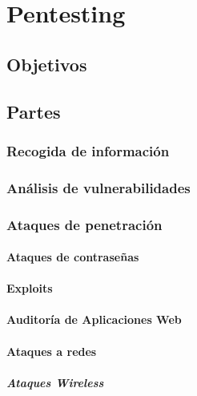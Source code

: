 \chapter{Pentesting}

\section{Objetivos}


\section{Partes}

\subsection{Recogida de información}

\subsection{Análisis de vulnerabilidades}

\subsection{Ataques de penetración}

\subsubsection{Ataques de contraseñas}

\subsubsection{Exploits}

\subsubsection{Auditoría de Aplicaciones Web}

\subsubsection{Ataques a redes}

\paragraph{Ataques Wireless}